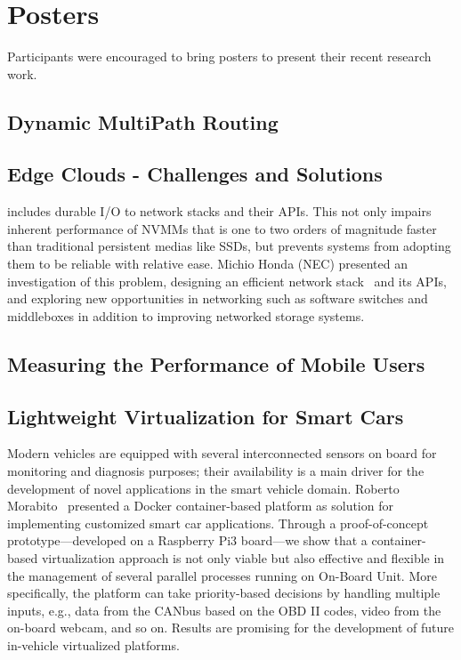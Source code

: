 \section{Posters}\label{sec:posters}

Participants were encouraged to bring posters to present
their recent research work.

\subsection{Dynamic MultiPath Routing}


\subsection{Edge Clouds - Challenges and Solutions}



includes durable I/O to network stacks and their APIs.  This not only impairs
inherent performance of NVMMs that is one to two orders of magnitude faster
than traditional persistent medias like SSDs, but prevents systems from
adopting them to be reliable with relative ease. Michio Honda (NEC) presented
an investigation of this problem, designing an efficient network
stack~\cite{mhonda:hotnets:2016} and its APIs, and exploring new opportunities
in networking such as software switches and middleboxes in addition to
improving networked storage systems.

\subsection{Measuring the Performance of Mobile Users}


\subsection{Lightweight Virtualization for Smart Cars}

Modern vehicles are equipped with several interconnected sensors on board for
monitoring and diagnosis purposes; their availability is a main driver for the
development of novel applications in the smart vehicle domain. Roberto
Morabito~\cite{rmorabito:im:2017} presented a Docker container-based platform
as solution for implementing customized smart car applications. Through a
proof-of-concept prototype—developed on a Raspberry Pi3 board—we show that a
container-based virtualization approach is not only viable but also effective
and flexible in the management of several parallel processes running on
On-Board Unit. More specifically, the platform can take priority-based
decisions by handling multiple inputs, e.g., data from the CANbus based on the
OBD II codes, video from the on-board webcam, and so on. Results are promising
for the development of future in-vehicle virtualized platforms.

